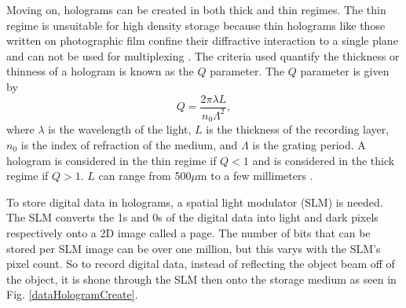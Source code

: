 \documentclass[ notitlepage, numerical, 11pt]{revtex4-1} %
\begin{document}
Moving on, holograms can be created in both thick and thin regimes. The thin regime is unsuitable for high density storage because thin holograms like those written on photographic film confine their diffractive interaction to a single plane and can not be used for multiplexing \cite{HDS}. The criteria used quantify the thickness or thinness of a hologram is known as the $Q$ parameter. The $Q$ parameter is given by 
\begin{equation}
Q = \frac{2\pi\lambda L}{n_0\Lambda^2},
\label{qParameter}
\end{equation}
where $\lambda$ is the wavelength of the light, $L$ is the thickness of the recording layer, $n_0$ is the index of refraction of the medium, and $\Lambda$ is the grating period. A hologram is considered in the thin regime if $Q<1$ and is considered in the thick regime if $Q>1$. $L$ can range from 500$\mu$m to a few millimeters \cite{HDS}.

To store digital data in holograms, a spatial light modulator (SLM) is needed. The SLM converts the 1s and 0s of the digital data into light and dark pixels respectively onto a 2D image called a page. The number of bits that can be stored per SLM image can be over one million, but this varys with the SLM's pixel count. So to record digital data, instead of reflecting the object beam off of the object, it is shone through the SLM then onto the storage medium as seen in Fig. \ref{dataHologramCreate}. 
\end{document}
